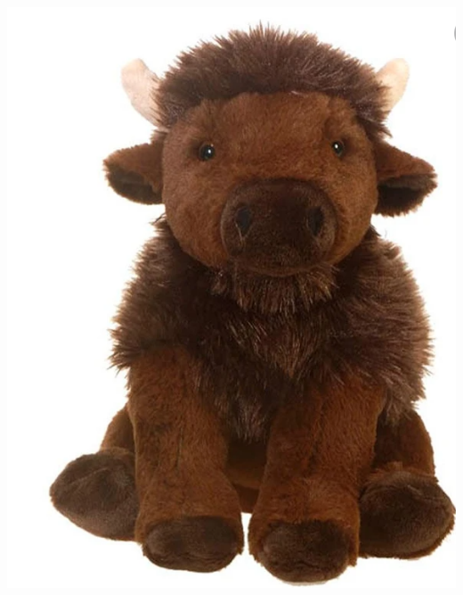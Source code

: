 \documentclass[aspectratio=169, 12pt, final]{beamer}
\begin{document}
\begin{frame}
\begin{columns}
\begin{column}{0.3\textwidth}
		\includegraphics[width=1\textwidth]{photo.png}
\end{column}	
\end{columns}
\end{frame}

\end{document}
